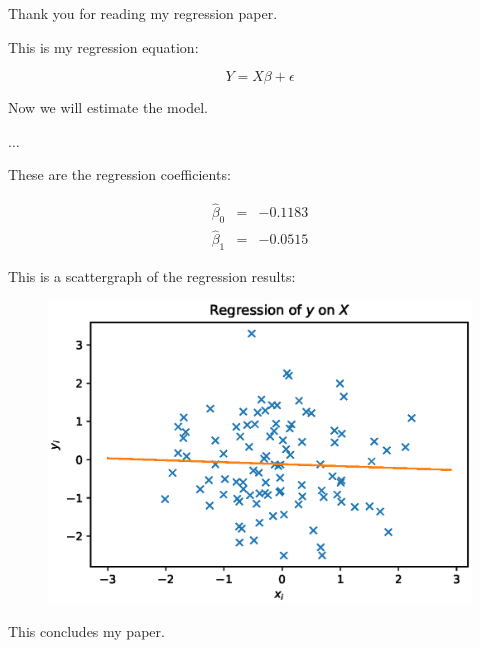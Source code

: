 \documentclass{paper}
\begin{document}
Thank you for reading my regression paper.


This is my regression equation:

\begin{equation}
%
	Y = X\beta + \epsilon
%
\end{equation}

Now we will estimate the model.



$\dots$



These are the regression coefficients:

\begin{align}
%
	\hat{\beta}_0 & = &    -0.1183 \\ 
%
	\hat{\beta}_1 & = &    -0.0515 
%
\end{align}

\pagebreak

This is a scattergraph of the regression results:

\begin{figure}
%
	\includegraphics[scale = 0.5]{regression_plot.eps}
%
\end{figure}

This concludes my paper.
\end{document}
